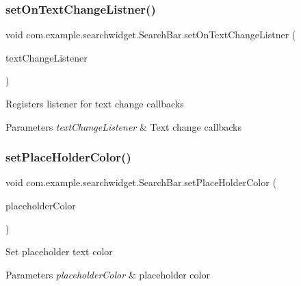 \subsubsection{\texorpdfstring{setOnTextChangeListner()}{setOnTextChangeListner()}}
{\footnotesize\ttfamily void com.\+example.\+searchwidget.\+Search\+Bar.\+set\+On\+Text\+Change\+Listner (\begin{DoxyParamCaption}\item[{\mbox{\hyperlink{interfacecom_1_1example_1_1searchwidget_1_1_search_bar_1_1_text_change_listener}{Text\+Change\+Listener}}}]{text\+Change\+Listener }\end{DoxyParamCaption})}

Registers listener for text change callbacks 
\begin{DoxyParams}{Parameters}
{\em text\+Change\+Listener} & Text change callbacks \\
\hline
\end{DoxyParams}
\mbox{\label{classcom_1_1example_1_1searchwidget_1_1_search_bar_aa27cf7d4a9e11d4b452a7be85c15e9e6}} 
\subsubsection{\texorpdfstring{setPlaceHolderColor()}{setPlaceHolderColor()}}
{\footnotesize\ttfamily void com.\+example.\+searchwidget.\+Search\+Bar.\+set\+Place\+Holder\+Color (\begin{DoxyParamCaption}\item[{int}]{placeholder\+Color }\end{DoxyParamCaption})}

Set placeholder text color


\begin{DoxyParams}{Parameters}
{\em placeholder\+Color} & placeholder color \\
\hline
\end{DoxyParams}
\mbox{\label{classcom_1_1example_1_1searchwidget_1_1_search_bar_a27d40730d4d6a78b9ee89a8c33120d13}} 
